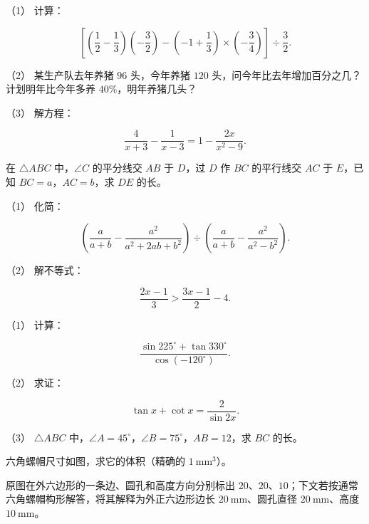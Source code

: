 \begin{question}

（1） 计算：

\nopagebreak[4]
\[
\left[\left(\frac12-\frac13\right)\left(-\frac32\right)-\left(-1+\frac13\right)\times\left(-\frac34\right)\right]\div\frac32.
\]

（2） 某生产队去年养猪 $96$ 头，今年养猪 $120$ 头，问今年比去年增加百分之几？计划明年比今年多养 $40\%$，明年养猪几头？

（3） 解方程：

\nopagebreak[4]
\[
\frac{4}{x+3}-\frac{1}{x-3}=1-\frac{2x}{x^2-9}.
\]

\Needspace{0.4\textheight}
\end{question}
\begin{question}
在 $\triangle ABC$ 中，$\angle C$ 的平分线交 $AB$ 于 $D$，过 $D$ 作 $BC$ 的平行线交 $AC$ 于 $E$，已知 $BC=a$，$AC=b$，求 $DE$ 的长。
\nopagebreak[4]
\begin{center}\end{center}
\nopagebreak[4]
\end{question}
\begin{question}

（1） 化简：

\nopagebreak[4]
\[
\left(\frac{a}{a+b}-\frac{a^2}{a^2+2ab+b^2}\right)\div\left(\frac{a}{a+b}-\frac{a^2}{a^2-b^2}\right).
\]

（2） 解不等式：

\nopagebreak[4]
\[
\frac{2x-1}{3}>\frac{3x-1}{2}-4.
\]

\end{question}
\begin{question}

（1） 计算：

\nopagebreak[4]
\[
\frac{\sin225^\circ+\tan330^\circ}{\cos(-120^\circ)}.
\]

（2） 求证：

\nopagebreak[4]
\[
\tan x+\cot x=\frac{2}{\sin2x}.
\]

（3） $\triangle ABC$ 中，$\angle A=45^\circ$，$\angle B=75^\circ$，$AB=12$，求 $BC$ 的长。

\Needspace{0.4\textheight}
\end{question}
\begin{question}
六角螺帽尺寸如图，求它的体积（精确的 $1\ \mathrm{mm^3}$）。
\nopagebreak[4]
\begin{center}\end{center}
\nopagebreak[4]
\begin{gktip}
原图在外六边形的一条边、圆孔和高度方向分别标出 $20$、$20$、$10$；下文若按通常六角螺帽构形解答，将其解释为外正六边形边长 $20\ \mathrm{mm}$、圆孔直径 $20\ \mathrm{mm}$、高度 $10\ \mathrm{mm}$。
\end{gktip}

\end{question}
